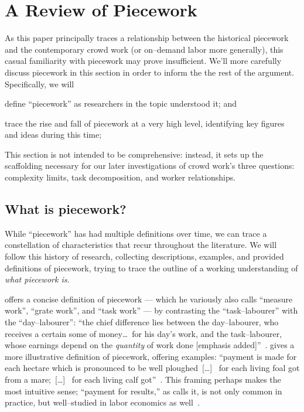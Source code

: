 \documentclass[trackingWork]{subfiles}
\begin{document}
\section{A Review of Piecework}

As this paper principally traces a relationship between
the historical piecework and the contemporary crowd work
(or on--demand labor more generally),
this casual familiarity with piecework may prove insufficient.
We'll more carefully discuss piecework in this section in order
to inform the the rest of the argument.
Specifically, we will
\begin{inlinelist}
  \item define ``piecework'' as researchers in the topic understood it; and
  \item trace the rise and fall of piecework at a very high level,
        identifying key figures and ideas during this time;
\end{inlinelist}
This section is not intended to be comprehensive: instead, it sets up the scaffolding necessary for our later investigations of crowd work's three questions: complexity limits, task decomposition, and worker relationships.


\subsection{What is piecework?}
While ``piecework'' has had multiple definitions over time,
we can trace a constellation of characteristics that recur throughout the literature.
We will follow this history of research, collecting
descriptions,
examples, and
provided definitions of piecework, trying
to trace the outline of a working understanding of
\textit{what piecework is}.

\citeauthor{hughRaynbirdTaskWork} offers
a concise definition of piecework
--- which he variously also calls ``measure work'', ``grate work'', and ``task work'' ---
by contrasting the ``task--labourer'' with the ``day--labourer'':
``the chief difference lies between the day--labourer,
who receives a certain some of money\dots~for his day's work,
and the task--labourer, whose earnings depend on the \textit{quantity} of work done [emphasis added]''~\cite{hughRaynbirdTaskWork}.
\citeauthor{10.2307/2338394} gives a more illustrative definition of piecework,
offering examples:
``payment is made for each hectare which is pronounced to be well ploughed~[\dots]~
for each living foal got from a mare;~[\dots]~
for each living calf got''~\cite{10.2307/2338394}.
This framing perhaps makes the most intuitive sense;
``payment for results,'' as \citeauthor{10.2307/2338394} calls it,
is not only common in practice, but well--studied in labor economics as well~\cite{Figlio2007901,weitzman1976new,10.2307/3003414,BJIR:BJIR038}.
\end{document}

